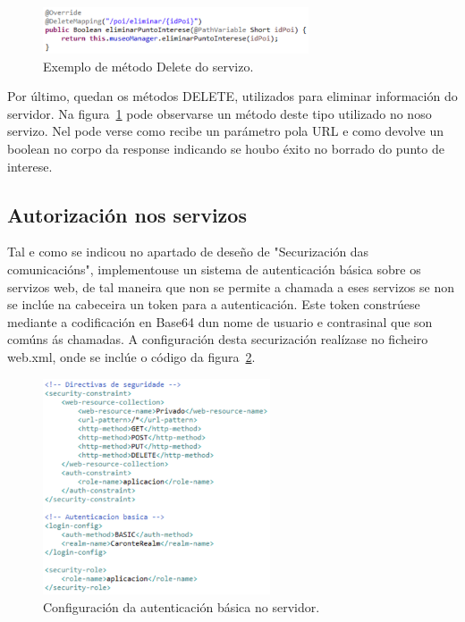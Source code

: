 \begin{figure}[tbh] 
	\begin{center}
		\includegraphics[width=0.7\textwidth]{figures/codigo/chamadaServizoDelete}
		\caption{Exemplo de método Delete do servizo.}
		\label{fig:chamadaServizoDelete}
	\end{center}
\end{figure}

Por último, quedan os métodos DELETE, utilizados para eliminar información do servidor. Na figura~\ref{fig:chamadaServizoDelete} pode observarse un método deste tipo utilizado no noso servizo. Nel pode verse como recibe un parámetro pola URL e como devolve un boolean no corpo da response indicando se houbo éxito no borrado do punto de interese.


\subsection{Autorización nos servizos}
Tal e como se indicou no apartado de deseño de "Securización das comunicacións", implementouse un sistema de autenticación básica sobre os servizos web, de tal maneira que non se permite a chamada a eses servizos se non se inclúe na cabeceira un token para a autenticación. Este token constrúese mediante a codificación en Base64 dun nome de usuario e contrasinal que son comúns ás chamadas. A configuración desta securización realízase no ficheiro web.xml, onde se inclúe o código da figura~\ref{fig:configuracionAutenticacion}.

\begin{figure}[htb] 
	\begin{center}
		\includegraphics[width=0.6\textwidth]{figures/codigo/configuracionAutenticacion}
		\caption{Configuración da autenticación básica no servidor.}
		\label{fig:configuracionAutenticacion}
	\end{center}
\end{figure}

